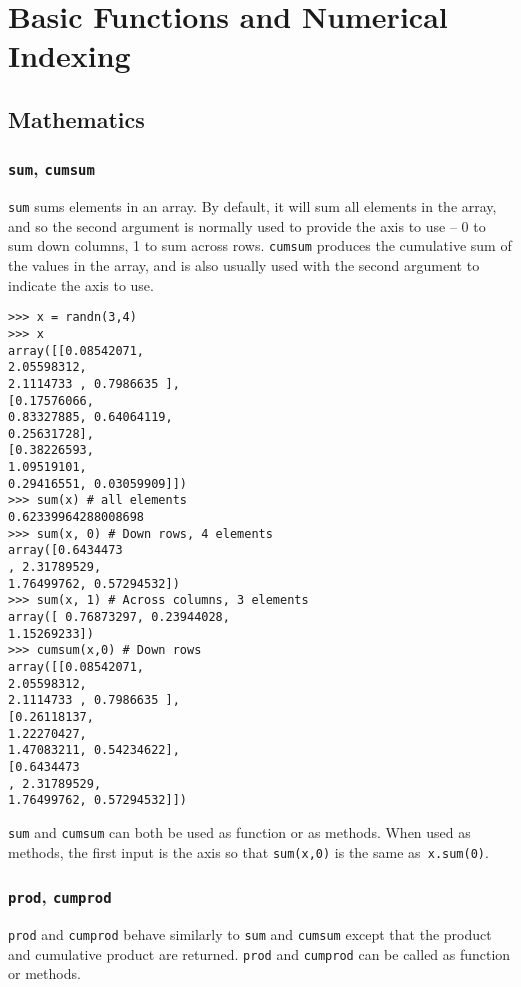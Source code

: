 \documentclass[KSmain.tex]{subfiles}
\begin{document}
 

\section{Basic Functions and Numerical Indexing}
\subsection{Mathematics}
\subsubsection*{\texttt{sum}, \texttt{cumsum}}
\texttt{sum} sums elements in an array. By default, it will sum all elements in the array, and so the second argument
is normally used to provide the axis to use – 0 to sum down columns, 1 to sum across rows. \texttt{cumsum} produces
the cumulative sum of the values in the array, and is also usually used with the second argument to indicate
the axis to use.
\begin{framed}
\begin{verbatim}
>>> x = randn(3,4)
>>> x
array([[0.08542071,
2.05598312,
2.1114733 , 0.7986635 ],
[0.17576066,
0.83327885, 0.64064119,
0.25631728],
[0.38226593,
1.09519101,
0.29416551, 0.03059909]])
>>> sum(x) # all elements
0.62339964288008698
>>> sum(x, 0) # Down rows, 4 elements
array([0.6434473
, 2.31789529,
1.76499762, 0.57294532])
>>> sum(x, 1) # Across columns, 3 elements
array([ 0.76873297, 0.23944028,
1.15269233])
>>> cumsum(x,0) # Down rows
array([[0.08542071,
2.05598312,
2.1114733 , 0.7986635 ],
[0.26118137,
1.22270427,
1.47083211, 0.54234622],
[0.6434473
, 2.31789529,
1.76499762, 0.57294532]])
\end{verbatim}
\end{framed}
\texttt{sum} and \texttt{cumsum} can both be used as function or as methods. When used as methods, the first input is the
axis so that \texttt{sum(x,0)} is the same as\texttt{ x.sum(0)}.
\subsubsection*{\texttt{prod}, \texttt{cumprod}}
\texttt{prod} and \texttt{cumprod} behave similarly to \texttt{sum} and \texttt{cumsum} except that the product and cumulative product are
returned. \texttt{prod} and \texttt{cumprod} can be called as function or methods.
\end{document}
